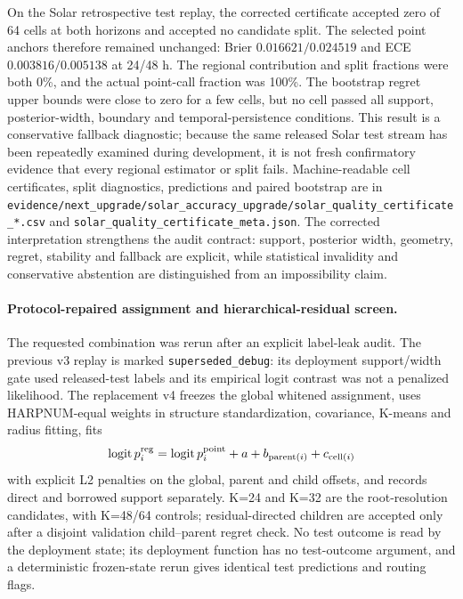 \documentclass[11pt,a4paper]{article}
\numberwithin{equation}{section}
\theoremstyle{definition}\newtheorem{definition}[theorem]{Definition}
\theoremstyle{remark}\newtheorem{remark}[theorem]{Remark}
\begin{document}
On the Solar retrospective test replay, the corrected certificate accepted zero of 64 cells at both horizons and accepted no candidate split. The selected point anchors therefore remained unchanged: Brier $0.016621/0.024519$ and ECE $0.003816/0.005138$ at 24/48 h. The regional contribution and split fractions were both 0\%, and the actual point-call fraction was 100\%. The bootstrap regret upper bounds were close to zero for a few cells, but no cell passed all support, posterior-width, boundary and temporal-persistence conditions. This result is a conservative fallback diagnostic; because the same released Solar test stream has been repeatedly examined during development, it is not fresh confirmatory evidence that every regional estimator or split fails. Machine-readable cell certificates, split diagnostics, predictions and paired bootstrap are in \texttt{evidence/next\_upgrade/solar\_accuracy\_upgrade/solar\_quality\_certificate\_*.csv} and \texttt{solar\_quality\_certificate\_meta.json}. The corrected interpretation strengthens the audit contract: support, posterior width, geometry, regret, stability and fallback are explicit, while statistical invalidity and conservative abstention are distinguished from an impossibility claim.

\paragraph{Protocol-repaired assignment and hierarchical-residual screen.}
The requested combination was rerun after an explicit label-leak audit. The previous v3 replay is marked \texttt{superseded\_debug}: its deployment support/width gate used released-test labels and its empirical logit contrast was not a penalized likelihood. The replacement v4 freezes the global whitened assignment, uses HARPNUM-equal weights in structure standardization, covariance, K-means and radius fitting, fits
\[
\operatorname{logit}p_i^{\rm reg}=\operatorname{logit}p_i^{\rm point}+a+b_{\mathrm{parent}(i)}+c_{\mathrm{cell}(i)}
\]
with explicit L2 penalties on the global, parent and child offsets, and records direct and borrowed support separately. K=24 and K=32 are the root-resolution candidates, with K=48/64 controls; residual-directed children are accepted only after a disjoint validation child--parent regret check. No test outcome is read by the deployment state; its deployment function has no test-outcome argument, and a deterministic frozen-state rerun gives identical test predictions and routing flags.
\end{document}
